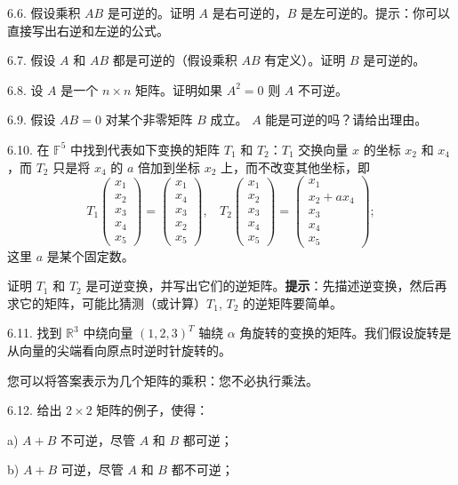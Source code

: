 6.6. 假设乘积 $AB$ 是可逆的。证明 $A$ 是右可逆的，$B$ 是左可逆的。提示：你可以直接写出右逆和左逆的公式。

6.7. 假设 $A$ 和 $AB$ 都是可逆的（假设乘积 $AB$ 有定义）。证明 $B$ 是可逆的。

6.8. 设 $A$ 是一个 $n \times n$ 矩阵。证明如果 $A^2 = 0$ 则 $A$ 不可逆。

6.9. 假设 $AB = 0$ 对某个非零矩阵 $B$ 成立。 $A$ 能是可逆的吗？请给出理由。

6.10. 在 $\mathbb{F}^5$ 中找到代表如下变换的矩阵 $T_1$ 和 $T_2$：$T_1$ 交换向量 $x$ 的坐标 $x_2$ 和 $x_4$，而 $T_2$ 只是将 $x_4$ 的 $a$ 倍加到坐标 $x_2$ 上，而不改变其他坐标，即
$$T_1 \begin{pmatrix} x_1 \\ x_2 \\ x_3 \\ x_4 \\ x_5 \end{pmatrix} = \begin{pmatrix} x_1 \\ x_4 \\ x_3 \\ x_2 \\ x_5 \end{pmatrix},~~~~T_2 \begin{pmatrix} x_1 \\ x_2 \\ x_3 \\ x_4 \\ x_5 \end{pmatrix} = \begin{pmatrix} x_1 \\ x_2 + ax_4 \\ x_3 \\ x_4 \\ x_5 \end{pmatrix};$$
这里 $a$ 是某个固定数。

证明 $T_1$ 和 $T_2$ 是可逆变换，并写出它们的逆矩阵。\textbf{提示}：先描述逆变换，然后再求它的矩阵，可能比猜测（或计算）$T_1$, $T_2$ 的逆矩阵要简单。

6.11. 找到 $\mathbb{R}^3$ 中绕向量 $(1, 2, 3)^T$ 轴绕 $\alpha$ 角旋转的变换的矩阵。我们假设旋转是从向量的尖端看向原点时逆时针旋转的。

您可以将答案表示为几个矩阵的乘积：您不必执行乘法。

6.12. 给出 $2 \times 2$ 矩阵的例子，使得：

a) $A+B$ 不可逆，尽管 $A$ 和 $B$ 都可逆；

b) $A+B$ 可逆，尽管 $A$ 和 $B$ 都不可逆；

